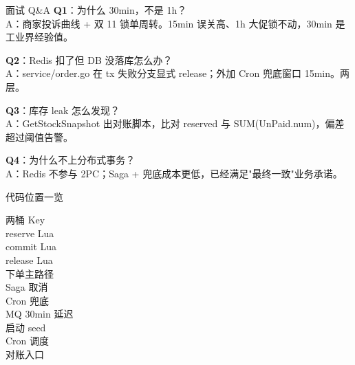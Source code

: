 \appendix

\begin{frame}{面试 Q\&A}
\textbf{Q1}：为什么 30min，不是 1h？\\
\hspace{4mm}\small A：商家投诉曲线 + 双 11 锁单周转。15min 误关高、1h 大促锁不动，30min 是工业界经验值。

\vspace{2mm}
\textbf{Q2}：Redis 扣了但 DB 没落库怎么办？\\
\hspace{4mm}\small A：service/order.go 在 tx 失败分支显式 release；外加 Cron 兜底窗口 15min。两层。

\vspace{2mm}
\textbf{Q3}：库存 leak 怎么发现？\\
\hspace{4mm}\small A：GetStockSnapshot 出对账脚本，比对 reserved 与 SUM(UnPaid.num)，偏差超过阈值告警。

\vspace{2mm}
\textbf{Q4}：为什么不上分布式事务？\\
\hspace{4mm}\small A：Redis 不参与 2PC；Saga + 兜底成本更低，已经满足"最终一致"业务承诺。
\end{frame}

\begin{frame}{代码位置一览}
\begin{description}
  \item[两桶 Key]
  \item[reserve Lua]
  \item[commit Lua]
  \item[release Lua]
  \item[下单主路径]
  \item[Saga 取消]
  \item[Cron 兜底]
  \item[MQ 30min 延迟]
  \item[启动 seed]
  \item[Cron 调度]
  \item[对账入口]
\end{description}
\end{frame}



